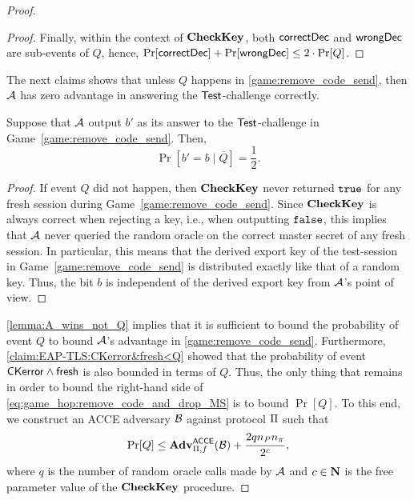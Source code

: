 \begin{proof}
\begin{proof}
Finally,
within the context of $\CK$,
both $\correct$ and $\wrong$ are sub-events of $Q$,
hence, $\Pr[\correct] + \Pr[\wrong] \leq 2 \cdot \Pr[Q]$. 
\end{proof}

The next claims shows that unless $Q$ happens in \cref{game:remove_code_send},
then $\A$ has zero advantage in  answering the $\Test$-challenge correctly.

\begin{claim}\label{lemma:A_wins_not_Q}
Suppose that $\A$ output $b'$ as its answer to the $\Test$-challenge in  Game~\ref{game:remove_code_send}.
Then,
\begin{equation}\label{eq:pr_not_Q_half}
	\Pr[b' = b \mid \overline{Q}] = \frac{1}{2}  .
\end{equation}
\end{claim}
\begin{proof}
If event $Q$ did not happen,
then $\CK$ never returned $\TRUE$ for any fresh session during Game~\ref{game:remove_code_send}.
Since $\CK$ is always correct when rejecting a key,
i.e., when outputting $\FALSE$,
this implies that $\A$ never queried the random oracle on the correct master secret of any fresh session.
In particular, 
this means that the derived export key of the test-session in Game~\ref{game:remove_code_send} is distributed exactly like that of a random key.
Thus,
the bit $b$ is independent of the derived export key from $\A$'s point of view. 
\end{proof}






\cref{lemma:A_wins_not_Q} implies that it is sufficient to bound the probability of event $Q$  to bound $\A$'s advantage in \cref{game:remove_code_send}. 
Furthermore, \cref{claim:EAP-TLS:CKerror&fresh<Q} showed that the probability of event $\CKerror \land \eventFresh$ is also bounded in terms of $Q$.
Thus,
the only thing that remains in order to bound the right-hand side of \cref{eq:game_hop:remove_code_and_drop_MS} is to bound $\Pr[Q]$.
To this end,
we construct an ACCE adversary $\A[B]$ against protocol $\protocol$ such that
\begin{equation}
	\Pr[Q] \leq  \adv_{\protocol,f}^{\acce}(\A[B]) + \frac{2 \unionbound}{2^{c}} , \label{eq:bound:Q}
\end{equation}
where $q$ is the number of random oracle calls made by $\A$ and $c \in \N$ is the free parameter value of the $\CK$ procedure.



\end{proof}
